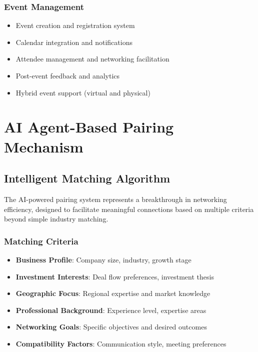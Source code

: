 \subsubsection{Event Management}
\begin{itemize}
    \item Event creation and registration system
    \item Calendar integration and notifications
    \item Attendee management and networking facilitation
    \item Post-event feedback and analytics
    \item Hybrid event support (virtual and physical)
\end{itemize}

\section{AI Agent-Based Pairing Mechanism}

\subsection{Intelligent Matching Algorithm}
The AI-powered pairing system represents a breakthrough in networking efficiency, designed to facilitate meaningful connections based on multiple criteria beyond simple industry matching.

\subsubsection{Matching Criteria}
\begin{itemize}
    \item \textbf{Business Profile}: Company size, industry, growth stage
    \item \textbf{Investment Interests}: Deal flow preferences, investment thesis
    \item \textbf{Geographic Focus}: Regional expertise and market knowledge
    \item \textbf{Professional Background}: Experience level, expertise areas
    \item \textbf{Networking Goals}: Specific objectives and desired outcomes
    \item \textbf{Compatibility Factors}: Communication style, meeting preferences
\end{itemize}


